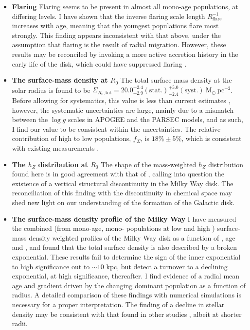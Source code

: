 \begin{itemize}
\item \textbf{Flaring} Flaring seems to be present in almost all mono-age populations, at differing levels. I have shown that the inverse flaring scale length $R_{\mathrm{flare}}^{-1}$ increases with age, meaning that the youngest populations flare most strongly. This finding appears inconsistent with that above, under the assumption that flaring is the result of radial migration. However, these results may be reconciled by invoking a more active accretion history in the early life of the disk, which could have suppressed flaring \citep[e.g.][]{2014ApJ...781L..20M}.
\item \textbf{The surface-mass density at $R_0$} The total surface mass density at the solar radius is found to be  $\Sigma_{R_0, \text{tot}} = 20.0_{-2.9}^{+2.4}\mathrm{(stat.)}_{-2.4}^{+5.0}\mathrm{(syst.)}\ \mathrm{M_{\odot} \ pc^{-2}}$. Before allowing for systematics, this value is less than current estimates \citep[e.g.][]{2012ApJ...751..131B,2006MNRAS.372.1149F,2015ApJ...814...13M}, however, the systematic uncertainties are large, mainly due to a mismatch between the $\log{g}$ scales in APOGEE and the PARSEC models, and as such, I find our value to be consistent within the uncertainties. The relative contribution of high to low \afe{} populations, $f_\Sigma$, is $18\% \pm 5\%$, which is consistent with existing measurements \citep[e.g.][]{2016ARA&A..54..529B}. 
\item \textbf{The $h_Z$ distribution at $R_0$} The shape of the mass-weighted $h_Z$ distribution found here is in good agreement with that of \citet{2012ApJ...751..131B}, calling into question the existence of a vertical structural discontinuity in the Milky Way disk. The reconciliation of this finding with the discontinuity in chemical space \citep[e.g. the bimodality in \afe{} at fixed \feh{}:][]{2015ApJ...808..132H,2014ApJ...796...38N} may shed new light on our understanding of the formation of the Galactic disk.
\item \textbf{The surface-mass density profile of the Milky Way} I have measured the combined (from mono-age, mono-\feh{} populations at low and high \afe{}) surface-mass density weighted profiles of the Milky Way disk as a function of \afe{}, age and \feh{}, and found that the total surface density is also described by a broken exponential. These results fail to determine the sign of the inner exponential to high significance out to $\sim 10$ kpc, but detect a turnover to a declining exponential, at high significance, thereafter. I find evidence of a radial mean age and \feh{} gradient driven by the changing dominant population as a function of radius. A detailed comparison of these findings with numerical simulations is necessary for a proper interpretation. The finding of a decline in stellar density may be consistent with that found in other studies \citep[e.g.][]{2009A&A...495..819R,2010MNRAS.402..713S}, albeit at shorter radii.
\end{itemize}

